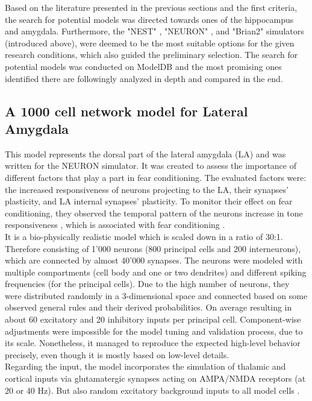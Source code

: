     Based on the literature presented in the previous sections and the first criteria, the search for potential models was directed towards ones of the hippocampus and amygdala. Furthermore, the "NEST" \cite{Gewaltig:NEST}, "NEURON" \cite{Hines.1997}, and "Brian2" \cite{Stimberg.20.8.2019} simulators (introduced above), were deemed to be the most suitable options for the given research conditions, which also guided the preliminary selection. The search for potential models was conducted on ModelDB \cite{McDougal.2017} and the most promising ones identified there are followingly analyzed in depth and compared in the end.

    \subsection{A 1000 cell network model for Lateral Amygdala}
    This model represents the dorsal part of the lateral amygdala (LA) and was written for the NEURON simulator. It was created to assess the importance of different factors that play a part in fear conditioning. The evaluated factors were: the increased responsiveness of neurons projecting to the LA, their synapses' plasticity, and LA internal synapses' plasticity. To monitor their effect on fear conditioning, they observed the temporal pattern of the neurons increase in tone responsiveness \cite{Kim.2013}, which is associated with fear conditioning \cite{Repa.2001}. \\
    It is a bio-physically realistic model which is scaled down in a ratio of 30:1. Therefore consisting of 1'000 neurons (800 principal cells and 200 interneurons), which are connected by almost 40'000 synapses. The neurons were modeled with multiple compartments (cell body and one or two dendrites) and different spiking frequencies (for the principal cells). Due to the high number of neurons, they were distributed randomly in a 3-dimensional space and connected based on some observed general rules and their derived probabilities. On average resulting in about 60 excitatory and 20 inhibitory inputs per principal cell. Component-wise adjustments were impossible for the model tuning and validation process, due to its scale. Nonetheless, it managed to reproduce the expected high-level behavior precisely, even though it is mostly based on low-level details. \\
    Regarding the input, the model incorporates the simulation of thalamic and cortical inputs via glutamatergic synapses acting on AMPA/NMDA receptors (at 20 or 40 Hz). But also random excitatory background inputs to all model cells \cite{Kim.2013}.

